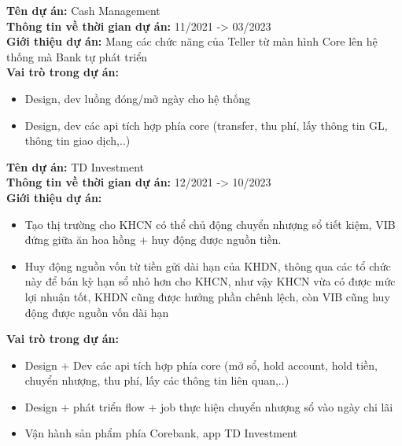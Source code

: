 \documentclass[11pt,a4paper,sans]{moderncv}
\begin{document}
\begin{mdframed}[style=ProjectFrame]
	\textbf{Tên dự án:} Cash Management \\
	\textbf{Thông tin về thời gian dự án:} 11/2021 -> 03/2023 \\
	\textbf{Giới thiệu dự án:}	Mang các chức năng của Teller từ màn hình Core lên hệ thống mà Bank tự phát triển\\
	\textbf{Vai trò trong dự án:}
	\begin{itemize}[leftmargin=0.6cm,noitemsep,topsep=0pt,label=-]
	\item Design, dev luồng đóng/mở ngày cho hệ thống
	\item Design, dev các api tích hợp phía core (transfer, thu phí, lấy thông tin GL, thông tin giao dịch,..)
	\end{itemize}
\end{mdframed}
\begin{mdframed}[style=ProjectFrame]
	\textbf{Tên dự án:} TD Investment \\
	\textbf{Thông tin về thời gian dự án:} 12/2021 -> 10/2023 \\
	\textbf{Giới thiệu dự án:} 
	\begin{itemize}[leftmargin=0.6cm,noitemsep,topsep=0pt,label=-]
		\item Tạo thị trường cho KHCN có thể chủ động chuyển nhượng sổ tiết kiệm, VIB đứng giữa ăn hoa hồng + huy động được nguồn tiền.
		\item Huy động nguồn vốn từ tiền gửi dài hạn của KHDN, thông qua các tổ chức này để bán kỳ hạn sổ nhỏ hơn cho KHCN, như vậy KHCN vừa có được mức lợi nhuận tốt, KHDN cũng được hưởng phần chênh lệch, còn VIB cũng huy động được nguồn vốn dài hạn
	\end{itemize}
	\textbf{Vai trò trong dự án:}
	\begin{itemize}[leftmargin=0.6cm,noitemsep,topsep=0pt,label=-]
		\item Design + Dev các api tích hợp phía core (mở sổ, hold account, hold tiền, chuyển nhượng, thu phí, lấy các thông tin liên quan,..)
		\item Design + phát triển flow + job thực hiện chuyển nhượng sổ vào ngày chi lãi
		\item Vận hành sản phẩm phía Corebank, app TD Investment
	\end{itemize}
\end{mdframed}
\end{document}
